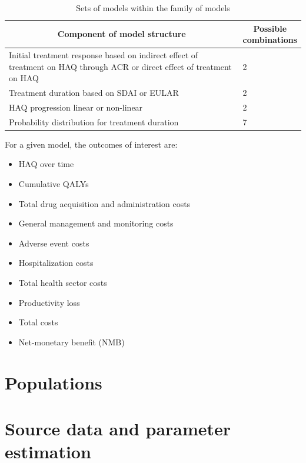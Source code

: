 \documentclass[11pt,final,fleqn]{article}\usepackage[]{graphicx}\usepackage[]{color}
\theoremstyle{plain}
\begin{document}
\begin{table}[!ht]
\begin{center}
\begin{threeparttable}
\caption{Sets of models within the family of models} \label{tbl:competing-structures}
\begin{tabular}{p{0.80\linewidth}p{0.20\linewidth}}
\hline
\multicolumn{1}{c}{Component of model structure} & \multicolumn{1}{c}{Possible combinations} \\
\hline
Initial treatment response based on indirect effect of treatment on HAQ through ACR or direct effect of treatment on HAQ  & 2  \\
Treatment duration based on SDAI or EULAR & 2 \\
HAQ progression linear or non-linear & 2 \\
Probability distribution for treatment duration & 7 \\
\hline
\hline
\end{tabular}
\end{threeparttable}
\end{center}
\end{table}\renewcommand{\arraystretch}{1}

For a given model, the outcomes of interest are:

\begin{itemize}
\item HAQ over time
\item Cumulative QALYs
\item Total drug acquisition and administration costs
\item General management and monitoring costs
\item Adverse event costs
\item Hospitalization costs
\item Total health sector costs
\item Productivity loss
\item Total costs
\item Net-monetary benefit (NMB)
\end{itemize}

\section{Populations}\label{sec:populations}

\section{Source data and parameter estimation}\label{sec:data-parameters}
\end{document}
